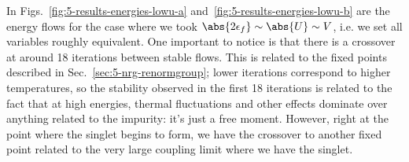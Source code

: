 In Figs.~\ref{fig:5-results-energies-lowu-a} and~\ref{fig:5-results-energies-lowu-b} are the energy flows for the case where we took $\abs{2\epsilon_f} \sim \abs{U} \sim V$, i.e. we set all variables roughly equivalent. One important to notice is that there is a crossover at around 18 iterations between stable flows. This is related to the fixed points described in Sec.~\ref{sec:5-nrg-renormgroup}; lower iterations correspond to higher temperatures, so the stability observed in the first 18 iterations is related to the fact that at high energies, thermal fluctuations and other effects dominate over anything related to the impurity: it's just a free moment. However, right at the point where the singlet begins to form, we have the crossover to another fixed point related to the very large coupling limit where we have the singlet.

